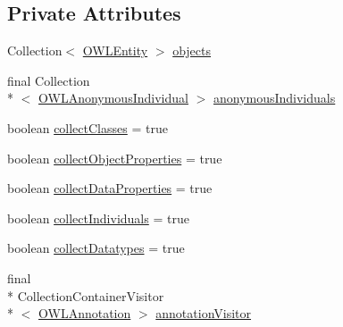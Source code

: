 \subsection*{Private Attributes}
\begin{DoxyCompactItemize}
\item 
Collection$<$ \hyperlink{interfaceorg_1_1semanticweb_1_1owlapi_1_1model_1_1_o_w_l_entity}{O\-W\-L\-Entity} $>$ \hyperlink{classuk_1_1ac_1_1manchester_1_1cs_1_1owl_1_1owlapi_1_1_o_w_l_entity_collection_container_collector_a86025cdbc20ee5bdcbc49460af810802}{objects}
\item 
final Collection\\*
$<$ \hyperlink{interfaceorg_1_1semanticweb_1_1owlapi_1_1model_1_1_o_w_l_anonymous_individual}{O\-W\-L\-Anonymous\-Individual} $>$ \hyperlink{classuk_1_1ac_1_1manchester_1_1cs_1_1owl_1_1owlapi_1_1_o_w_l_entity_collection_container_collector_a753b3ae6dab60b1ceaeb1aa24262d9da}{anonymous\-Individuals}
\item 
boolean \hyperlink{classuk_1_1ac_1_1manchester_1_1cs_1_1owl_1_1owlapi_1_1_o_w_l_entity_collection_container_collector_afa5b3a20a1dd411d8d26e82eeab98404}{collect\-Classes} = true
\item 
boolean \hyperlink{classuk_1_1ac_1_1manchester_1_1cs_1_1owl_1_1owlapi_1_1_o_w_l_entity_collection_container_collector_a52df7cb6897f680e9156a29e62ede9c2}{collect\-Object\-Properties} = true
\item 
boolean \hyperlink{classuk_1_1ac_1_1manchester_1_1cs_1_1owl_1_1owlapi_1_1_o_w_l_entity_collection_container_collector_a4913cb0fb60217e7750a80e143dc11b5}{collect\-Data\-Properties} = true
\item 
boolean \hyperlink{classuk_1_1ac_1_1manchester_1_1cs_1_1owl_1_1owlapi_1_1_o_w_l_entity_collection_container_collector_a88c84cfbc6388bf30985463140593154}{collect\-Individuals} = true
\item 
boolean \hyperlink{classuk_1_1ac_1_1manchester_1_1cs_1_1owl_1_1owlapi_1_1_o_w_l_entity_collection_container_collector_a3c3a68e128f73f0238440249b1147698}{collect\-Datatypes} = true
\item 
final \\*
Collection\-Container\-Visitor\\*
$<$ \hyperlink{interfaceorg_1_1semanticweb_1_1owlapi_1_1model_1_1_o_w_l_annotation}{O\-W\-L\-Annotation} $>$ \hyperlink{classuk_1_1ac_1_1manchester_1_1cs_1_1owl_1_1owlapi_1_1_o_w_l_entity_collection_container_collector_a9a3b03b764e3ecc37dc47f2bc844377c}{annotation\-Visitor}
\end{DoxyCompactItemize}
